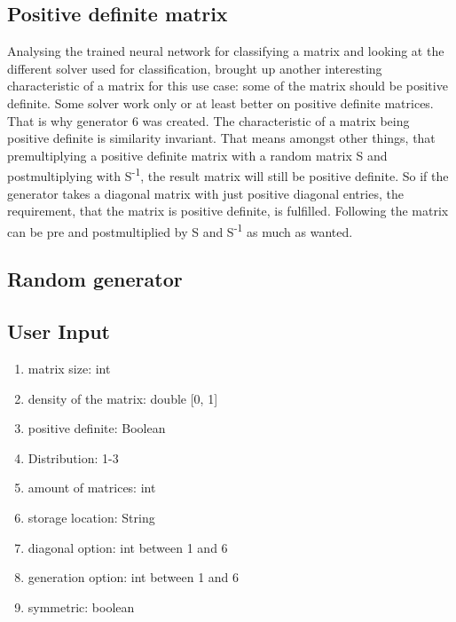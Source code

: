 \documentclass[parskip=full]{scrartcl}
\begin{document}
\subsection{Positive definite matrix}
Analysing the trained neural network for classifying a matrix and looking at the different solver used for classification, brought up another interesting characteristic of a matrix for this use case: some of the matrix should be positive definite.
Some solver work only or at least better on positive definite matrices. 
That is why generator 6 was created. 
The characteristic of a matrix being positive definite is similarity invariant. 
That means amongst other things, that premultiplying a positive definite matrix with a random matrix S and postmultiplying with S\textsuperscript{-1}, the result matrix will still be positive definite. 
So if the generator takes a diagonal matrix with just positive diagonal entries, the requirement, that the matrix is positive definite, is fulfilled.
Following the matrix can be pre and postmultiplied by S and S\textsuperscript{-1} as much as wanted. 

\subsection{Random generator}

\subsection{User Input}
\begin{enumerate}
	\item matrix size: int
	\item density of the matrix: double [0, 1]
	\item positive definite: Boolean
	\item Distribution: 1-3
	\item amount of matrices: int
	\item storage location: String
	\item diagonal option: int between 1 and 6
	\item generation option: int between 1 and 6
	\item symmetric: boolean
\end{enumerate}

\newpage
\end{document}

